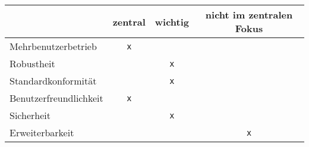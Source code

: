 
\begin{table}[H]
	\centering
	\begin{tabular}{lccc}
		\toprule
		& zentral & wichtig & nicht im zentralen Fokus \\
		\midrule
		Mehrbenutzerbetrieb & \texttt{x} & & \\
		Robustheit & & \texttt{x} & \\
		Standardkonformität & & \texttt{x} & \\
		Benutzerfreundlichkeit & \texttt{x} & & \\
		Sicherheit & &  \texttt{x} & \\
		Erweiterbarkeit & & & \texttt{x} \\
	\end{tabular}
\end{table}